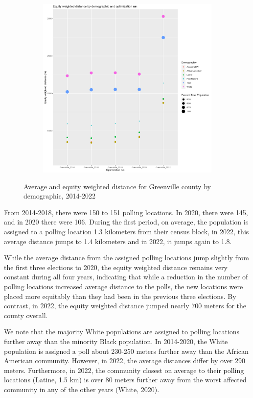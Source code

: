 \documentclass[11pt]{article}
\theoremstyle{remark}
\theoremstyle{definition}
\begin{document}
\begin{figure}
\begin{subfigure}{.8\textwidth}
		\includegraphics[width=.8\linewidth]{result analysis/Greenville_SC_original_configs/orig_pop_scaled_y_EDE}
		\label{sfig:Greenville equity dist}
	\end{subfigure}
	\caption{Average and equity weighted distance for Greenville county by demographic, 2014-2022}
	\label{fig:Greenville distance graphs}
\end{figure}


From 2014-2018, there were 150 to 151 polling locations. In 2020, there were 145, and in 2020 there were 106. During the first period, on average, the population is assigned to a polling location 1.3 kilometers from their census block, in 2022, this average distance jumps to 1.4 kilometers and in 2022, it jumps again to 1.8.

While the average distance from the assigned polling locations jump slightly from the first three elections to 2020, the equity weighted distance remains very constant during all four years, indicating that while a reduction in the number of polling locations increased average distance to the polls, the new locations were placed more equitably than they had been in the previous three elections. By contrast, in 2022, the equity weighted distance jumped nearly 700 meters for the county overall. 

We note that the majority White populations are assigned to polling locations further away than the minority Black population. In 2014-2020, the White population is assigned a poll about 230-250 meters further away than the African American community. However, in 2022, the average distances differ by over 290 meters. Furthermore, in 2022, the community closest on average to their polling locations (Latine, 1.5 km) is over 80 meters further away from the worst affected community in any of the other years (White, 2020).
\end{document}
